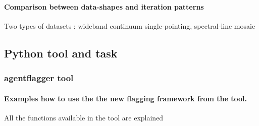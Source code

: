 \paragraph{Comparison between data-shapes and iteration patterns}

Two types of datasets : wideband continuum single-pointing,   spectral-line mosaic






\subsection{Python tool and task}

\subsubsection{agentflagger tool}
\paragraph{Examples how to use the the new flagging framework from the tool.}
All the functions available in the tool are explained

